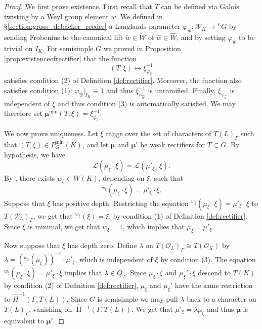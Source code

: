\documentclass{compositio}
\theoremstyle{plain}
\newcommand{\HT}[1]{\hat{\HH}{}^{#1}}
\theoremstyle{definition}
\DeclareMathOperator{\HH}{H}
\newcommand{\OK}{\mathcal{O}_K}
\newcommand{\PL}{\mathcal{P}_L}
\newcommand{\OL}{\mathcal{O}_L}
\newcommand{\Weil}{\mathcal{W}}
\newcommand{\Lpack}{\mathcal{L}}
\newcommand{\Pmin}{P_G^{\min}}
\newcommand{\bmu}{\boldsymbol\mu}
\newcommand{\mumin}{\bmu^{\min}}
\begin{document}
\begin{proof}
We first prove existence.
First recall that $T$ can be defined
via Galois twisting by a Weyl group element $w$.  We defined in
\S\ref{section:gross_debacker_reeder}
a Langlands parameter $\varphi_{\hat{w}} :\Weil _K \rightarrow {}^L G$ by
sending Frobenius to the canonical lift
$\tilde{w} \in \widetilde{W}$ of $\hat{w} \in \hat{W}$, and by setting
$\varphi_{\hat{w}}$ to be trivial on $I_K$.
For semisimple $G$
we proved in Proposition \ref{prop:existenceofrectifier}
that the function $$(T, \xi) \mapsto \xi_{\varphi_{\hat{w}}}^{-1}$$
satisfies condition (2) of Definition \ref{def:rectifier}.  Moreover, the function also
satisfies condition (1): $\varphi_{\hat{w}}|_{I_K} \equiv 1$ and thus
$\xi_{\varphi_{\hat{w}}}^{-1}$ is unramified.
Finally, $\xi_{\varphi_{\hat{w}}}$ is independent of $\xi$
and thus condition (3) is automatically satisfied.
We may therefore set
$\mumin(T,\xi) = \xi_{\varphi_{\hat{w}}}^{-1}$.

We now prove uniqueness.
Let $\xi$ range over the set of characters of $T(L)_{\Gamma}$
such that $(T, \xi) \in \Pmin(K)$, and let
$\bmu$ and $\bmu'$ be weak rectifiers for
$T \subset G$.  By hypothesis, we have
$$\Lpack(\mu_{\xi} \cdot \xi) = \Lpack(\mu'_{\xi} \cdot \xi).$$
By \cite[\S10]{murnaghan:11}, there exists $w_{\xi} \in W(K)$,
depending on $\xi$, such that
$${}^{w_{\xi}} (\mu_\xi \cdot \xi) = \mu'_\xi \cdot \xi.$$
Suppose that $\xi$ has positive depth.
Restricting the equation
${}^{w_\xi} (\mu_\xi \cdot \xi) = \mu'_\xi \cdot \xi$
to $T(\PL)_{\Gamma}$, we get that ${}^{w_{\xi}} (\xi) = \xi$,
by condition (1) of Definition \ref{def:rectifier}.
Since $\xi$ is minimal, we get that $w_{\xi} = 1$, which implies
that $\mu_{\xi} = \mu'_{\xi}$.

Now suppose that $\xi$ has depth zero.
Define $\lambda$ on $T(\OL)_{\Gamma} \cong T(\OK)$ by $\lambda = ({}^{w_\xi} (\mu_\xi))^{-1} \cdot \mu'_\xi$,
which is independent of $\xi$ by condition (3). The equation ${}^{w_\xi} (\mu_\xi \cdot \xi) = \mu'_\xi \cdot \xi$
implies that $\lambda \in Q_T$.  Since $\mu_\xi \cdot \xi$ and $\mu_\xi' \cdot \xi$ descend to
$T(K)$ by condition (2) of Definition \ref{def:rectifier}, $\mu_\xi$ and $\mu_\xi'$ have the
same restriction to $\hat{H}^{-1}(\Gamma, T(L))$.  Since $G$ is semisimple we may pull $\lambda$ back to
a character on $T(L)_\Gamma$, vanishing on $\HT{-1}(\Gamma, T(L))$.  We get that $\mu'_\xi = \lambda\mu_\xi$
and thus $\bmu$ is equivalent to $\bmu'$.
\end{proof}
\end{document}
